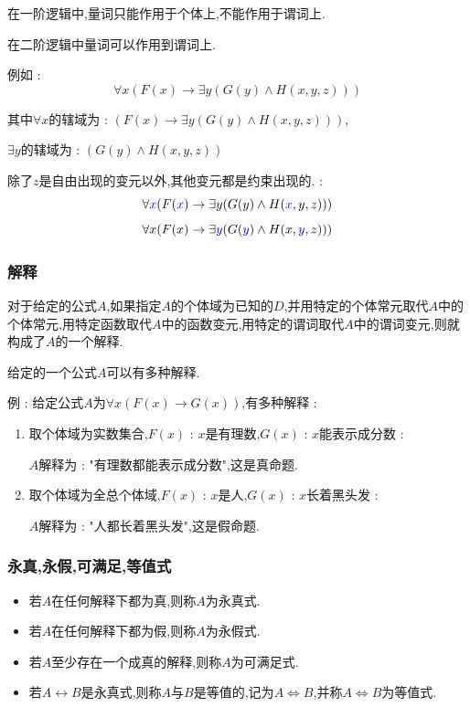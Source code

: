\documentclass[UTF8,12pt]{ctexbook}
\begin{document}
{{{{{    在一阶逻辑中,量词只能作用于个体上,不能作用于谓词上.

    在二阶逻辑中量词可以作用到谓词上.

    例如 : $$
      \forall x (F(x) \to \exists y (G(y) \land H(x,y,z)))
    $$

    其中$\forall x$的辖域为 : $(F(x) \to \exists y (G(y) \land H(x,y,z)))$,

    $\exists y$的辖域为 : $(G(y) \land H(x,y,z))$

    除了$z$是自由出现的变元以外,其他变元都是约束出现的. :
    $$
    \forall \textcolor{blue}{x} (F(\textcolor{blue}{x}) \to \exists y (G(y) \land H(\textcolor{blue}{x},y,z)))
    $$
    $$
    \forall x (F(x) \to \exists \textcolor{blue}{y} (G(\textcolor{blue}{y}) \land H(x,\textcolor{blue}{y},z)))
    $$
    }%

    \subsubsection{解释}{
      对于给定的公式$A$,如果指定$A$的个体域为已知的$D$,并用特定的个体常元取代$A$中的个体常元,用特定函数取代$A$中的函数变元,用特定的谓词取代$A$中的谓词变元,则就构成了$A$的一个解释.

      给定的一个公式$A$可以有多种解释.

      例 : 给定公式$A$为$\forall x (F(x) \to G(x))$,有多种解释 :
      \begin{enumerate}
        \item {
              取个体域为实数集合,$F(x)$ : $x$是有理数,$G(x)$ : $x$能表示成分数 :

              $A$解释为 : "有理数都能表示成分数",这是真命题.
              }
        \item {
              取个体域为全总个体域,$F(x)$ : $x$是人,$G(x)$ : $x$长着黑头发 :

              $A$解释为 : "人都长着黑头发",这是假命题.
              }
      \end{enumerate}
    }%

    \subsubsection{永真,永假,可满足,等值式}{
      \begin{itemize}
        \item 若$A$在任何解释下都为真,则称$A$为永真式.
        \item 若$A$在任何解释下都为假,则称$A$为永假式.
        \item 若$A$至少存在一个成真的解释,则称$A$为可满足式.
        \item 若$A \longleftrightarrow B$是永真式,则称$A$与$B$是等值的,记为$A \Leftrightarrow B$,并称$A \Leftrightarrow B$为等值式.
      \end{itemize}
    }%

}}}}
\end{document}
